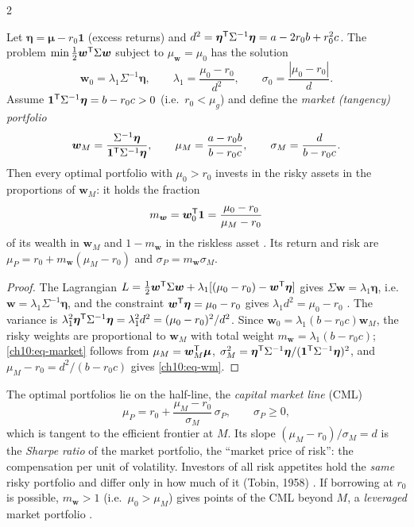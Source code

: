 \begin{paracol}{2}
\begin{theorem}\label{ch10:thm-tobin}
Let $\bm\eta=\bm\mu-r_0\bm 1$ (excess returns) and $d^2=\bm\eta^{\mathsf T}\Sigma^{-1}\bm\eta=a-2r_0b+r_0^2c$. The problem
$\min\frac12\bm w^{\mathsf T}\Sigma\bm w$ subject to $\mu_{\bm w}=\mu_0$ has the solution
\begin{equation}\label{ch10:eq-rfsol}
  \bm w_0=\lambda_1\Sigma^{-1}\bm\eta,\qquad \lambda_1=\frac{\mu_0-r_0}{d^2},\qquad
  \sigma_0=\frac{|\mu_0-r_0|}{d}.
\end{equation}
Assume $\bm 1^{\mathsf T}\Sigma^{-1}\bm\eta=b-r_0c>0$ (i.e.\ $r_0<\mu_g$) and define the \emph{market (tangency) portfolio}
\begin{equation}\label{ch10:eq-market}
  \bm w_M=\frac{\Sigma^{-1}\bm\eta}{\bm 1^{\mathsf T}\Sigma^{-1}\bm\eta},\qquad
  \mu_M=\frac{a-r_0b}{b-r_0c},\qquad \sigma_M=\frac{d}{b-r_0c}.
\end{equation}
Then every optimal portfolio with $\mu_0>r_0$ invests in the risky assets in the proportions of $\bm w_M$: it holds
the fraction
\begin{equation}\label{ch10:eq-wm}
  m_{\bm w}=\bm w_0^{\mathsf T}\bm 1=\frac{\mu_0-r_0}{\mu_M-r_0}
\end{equation}
of its wealth in $\bm w_M$ and $1-m_{\bm w}$ in the riskless asset .
Its return and risk are $\mu_P=r_0+m_{\bm w}(\mu_M-r_0)$ and $\sigma_P=m_{\bm w}\sigma_M$.
\end{theorem}
\begin{proof}
The Lagrangian $L=\frac12\bm w^{\mathsf T}\Sigma\bm w+\lambda_1[(\mu_0-r_0)-\bm w^{\mathsf T}\bm\eta]$ gives
$\Sigma\bm w=\lambda_1\bm\eta$, i.e.\ $\bm w=\lambda_1\Sigma^{-1}\bm\eta$, and the constraint
$\bm w^{\mathsf T}\bm\eta=\mu_0-r_0$ gives $\lambda_1d^2=\mu_0-r_0$ . The variance is
$\lambda_1^2\bm\eta^{\mathsf T}\Sigma^{-1}\bm\eta=\lambda_1^2d^2=(\mu_0-r_0)^2/d^2$. Since $\bm w_0=\lambda_1(b-r_0c)\bm w_M$,
the risky weights are proportional to $\bm w_M$ with total weight $m_{\bm w}=\lambda_1(b-r_0c)$; \eqref{ch10:eq-market}
follows from $\mu_M=\bm w_M^{\mathsf T}\bm\mu$, $\sigma_M^2=\bm\eta^{\mathsf T}\Sigma^{-1}\bm\eta/(\bm 1^{\mathsf T}\Sigma^{-1}\bm\eta)^2$, and
$\mu_M-r_0=d^2/(b-r_0c)$ gives \eqref{ch10:eq-wm}.
\end{proof}

\begin{corollary}\label{ch10:cor-cml}
The optimal portfolios lie on the half-line, the \emph{capital market line} (CML)
\begin{equation}\label{ch10:eq-cml}
  \mu_P=r_0+\frac{\mu_M-r_0}{\sigma_M}\,\sigma_P,\qquad \sigma_P\ge0,
\end{equation}
which is tangent to the efficient frontier at $M$. Its slope $(\mu_M-r_0)/\sigma_M=d$ is the \emph{Sharpe ratio} of
the market portfolio, the ``market price of risk'': the compensation per unit of volatility. Investors of all risk
appetites hold the \emph{same} risky portfolio and differ only in how much of it (Tobin, 1958)
. If borrowing at $r_0$ is possible, $m_{\bm w}>1$ (i.e.\ $\mu_0>\mu_M$) gives points of the CML
beyond $M$, a \emph{leveraged} market portfolio .
\end{corollary}


\end{paracol}

